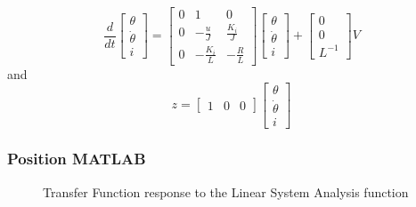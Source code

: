 \begin{equation}
\frac{d}{dt} \begin{bmatrix} \theta \\ \dot{\theta} \\ i \end{bmatrix} = \begin{bmatrix} 0 & 1 & 0\\ 0 &- \frac{u}{J} & \frac{K_{i}}{J} \\ 0 & - \frac{K_{i}}{L} & - \frac{R}{L}  \end{bmatrix} 
 \begin{bmatrix} \theta \\ \dot{\theta} \\ i \end{bmatrix} + \begin{bmatrix} 0 \\ 0 \\ L^{-1} \end{bmatrix} V
\end{equation}
and
\begin{equation}
z = \begin{bmatrix} 1 & 0 & 0 \end{bmatrix} \begin{bmatrix} \theta \\ \dot{\theta} \\ i \end{bmatrix}
\end{equation}

   	\subsubsection{Position MATLAB}
    
   \begin{figure}[H]
\centering
{}
\caption{\label{fig:position_1} Transfer Function response to the Linear System Analysis function}
\end{figure}

